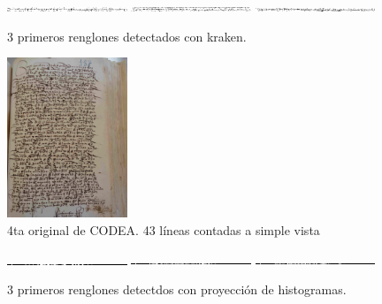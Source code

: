 \documentclass[11pt,a4paper]{article}
\begin{document}
\begin{figure}[H] 
\centering 
\begin{minipage}{1.0\textwidth} 
\includegraphics[width=0.32\textwidth]{3_CODEA_1_kraken.png} 
\includegraphics[width=0.32\textwidth]{3_CODEA_2_kraken.png} 
\includegraphics[width=0.32\textwidth]{3_CODEA_3_kraken.png} 
\caption{3 primeros renglones detectados con kraken.} 
\label{fig:3 líneas kraken 3ra CODEA} 
\end{minipage} 
\end{figure}

\begin{figure}[H] 
\centering 
\begin{minipage}{1.0\textwidth} 
\includegraphics[width=0.32\textwidth]{CODEA-2038_1r.jpg} 
\caption{4ta original de CODEA. 43 líneas contadas a simple vista} 
\label{fig:4ta CODEA} 
\end{minipage} 
\end{figure}

\begin{figure}[H] 
\centering 
\begin{minipage}{1.0\textwidth} 
\includegraphics[width=0.32\textwidth]{4_CODEA_1_PH.png} 
\includegraphics[width=0.32\textwidth]{4_CODEA_2_PH.png} 
\includegraphics[width=0.32\textwidth]{4_CODEA_3_PH.png} 
\caption{3 primeros renglones detectdos con proyección de histogramas.} 
\label{fig:3 líneas PH 4ta CODEA} 
\end{minipage} 
\end{figure}
\end{document}
